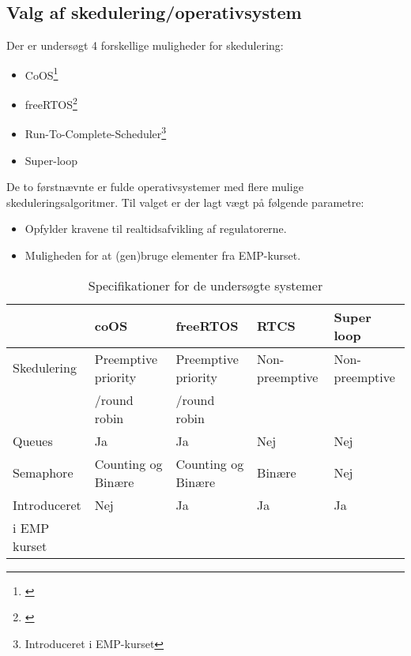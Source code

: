 \subsection{Valg af skedulering/operativsystem}
Der er undersøgt 4 forskellige muligheder for skedulering: 

\begin{itemize}
\itemsep1pt
	\item CoOS\footnote{\citep{www.coocox.com/CoOS.htm}} 
	\item freeRTOS\footnote{\citep{freertos.org}}
	\item Run-To-Complete-Scheduler\footnote{Introduceret i EMP-kurset}
	\item Super-loop
\end{itemize}

De to førstnævnte er fulde operativsystemer med flere mulige skeduleringsalgoritmer. 
Til valget er der lagt vægt på følgende parametre: 

\begin{itemize}
\itemsep1pt
	\item Opfylder kravene til realtidsafvikling af regulatorerne. 
	\item Muligheden for at (gen)bruge elementer fra EMP-kurset.
\end{itemize}

\begin{table}[h!]
\begin{tabular}{|l|l|l|l|l|}
\hline 
 & coOS & freeRTOS & RTCS & Super loop \\ 
\hline 
Skedulering & Preemptive priority  & Preemptive priority  & Non-preemptive & Non-preemptive  \\ 
			& /round robin		&	/round robin & &	\\
\hline 
Queues & Ja & Ja & Nej & Nej \\ 
\hline 
Semaphore & Counting og Binære  & Counting og Binære & Binære  & Nej  \\ 
\hline 
Introduceret & Nej & Ja & Ja & Ja \\ 
i EMP kurset &   &   &   &   \\
\hline 
\end{tabular} 
\caption{Specifikationer for de undersøgte systemer}
\label{tb:os_comparison}
\end{table}
%
